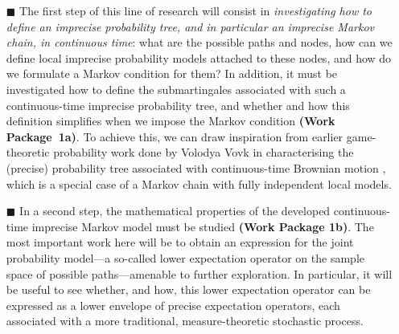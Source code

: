 \documentclass[11pt,dvipsnames,usenames,a4paper]{article}
\begin{document}
\vspace{6pt}
\begin{itemize}
\item[\tiny$\blacksquare$]
The first step of this line of research will consist in \emph{investigating how to define an imprecise probability tree, and in particular an imprecise Markov chain, in continuous time}: what are the possible paths and nodes, how can we define local imprecise probability models attached to these nodes, and how do we formulate a Markov condition for them?
In addition, it must be investigated how to define the submartingales associated with such a continuous-time imprecise probability tree, and whether and how this definition simplifies when we impose the Markov condition {\bf(Work Package~1a)}.
To achieve this, we can draw inspiration from earlier game-theoretic probability work done by Volodya Vovk in characterising the (precise) probability tree associated with continuous-time Brownian motion \cite{vovk2008:brownian,vovk2012:emergence:of:probability}, which is a special case of a Markov chain with fully independent local models.

\item[\tiny$\blacksquare$]
In a second step, the mathematical properties of the developed continuous-time imprecise Markov model must be studied {\bf(Work Package 1b)}. 
The most important work here will be to obtain an expression for the joint probability model---a so-called lower expectation operator on the sample space of possible paths---amenable to further exploration.
In particular, it will be useful to see whether, and how, this lower expectation operator can be expressed as a lower envelope of precise expectation operators, each associated with a more traditional, measure-theoretic stochastic process.


\end{itemize}
\end{document}
